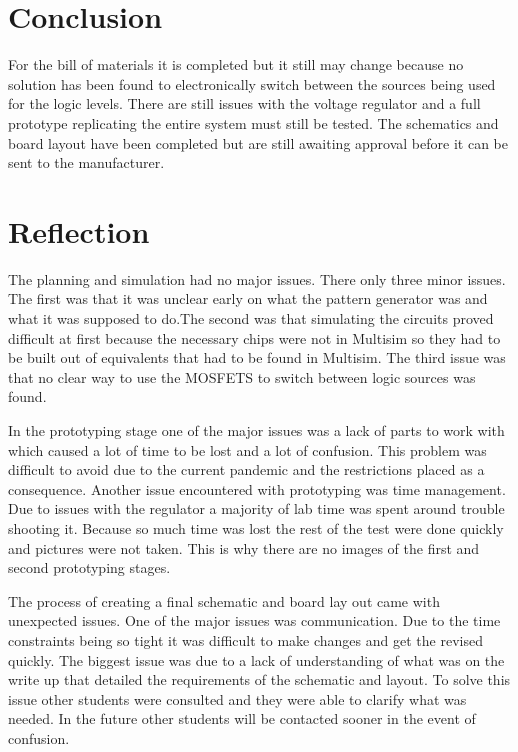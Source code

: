 \documentclass[12pt]{article}
\begin{document}
    \section{Conclusion}
    For the bill of materials it is completed but it still may change because no solution has been found to electronically switch between the sources being used for the logic levels. There are still issues with the voltage regulator and a full prototype replicating the entire system must still be tested. The schematics and board layout have been completed but are still awaiting approval before it can be sent to the manufacturer.

    \section{Reflection}
    The planning and simulation had no major issues. There only three minor issues. The first was that it was unclear early on what the pattern generator was and what it was supposed to do.The second was that simulating the circuits proved difficult at first because the necessary chips were not in Multisim so they had to be built out of equivalents that had to be found in Multisim. The third issue was that no clear way to use the MOSFETS to switch between logic sources was found.
    \par In the prototyping stage one of the major issues was a lack of parts to work with which caused a lot of time to be lost and a lot of confusion. This problem was difficult to avoid due to the current pandemic and the restrictions placed as a consequence. Another issue encountered with prototyping was time management. Due to issues with the regulator a majority of lab time was spent around trouble shooting it. Because so much time was lost the rest of the test were done quickly and pictures were not taken. This is why there are no images of the first and second prototyping stages.
    \par The process of creating a final schematic and board lay out came with unexpected issues. One of the major issues was communication. Due to the time constraints being so tight it was difficult to make changes and get the revised quickly. The biggest issue was due to a lack of understanding of what was on the write up that detailed the requirements of the schematic and layout. To solve this issue other students were consulted and they were able to clarify what was needed. In the future other students will be contacted sooner in the event of confusion.
\end{document}
